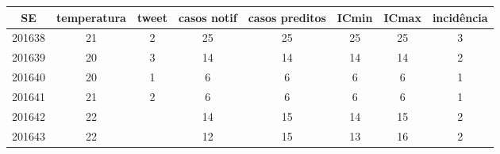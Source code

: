 \begin{tabular}{c|ccccccc}
  \hline
SE & temperatura & tweet & casos notif & casos preditos & ICmin & ICmax & incidência \\ 
  \hline
201638 & 21 & 2 & 25 & 25 & 25 & 25 & 3 \\ 
  201639 & 20 & 3 & 14 & 14 & 14 & 14 & 2 \\ 
  201640 & 20 & 1 & 6 & 6 & 6 & 6 & 1 \\ 
  201641 & 21 & 2 & 6 & 6 & 6 & 6 & 1 \\ 
  201642 & 22 &  & 14 & 15 & 14 & 15 & 2 \\ 
  201643 & 22 &  & 12 & 15 & 13 & 16 & 2 \\ 
   \hline
\end{tabular}
